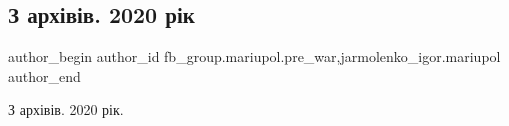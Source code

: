  
 
 
 
 

\subsection{З архівів. 2020 рік}
\label{sec:10_02_2023.fb.fb_group.mariupol.pre_war.1.z_arkh_v_v__2020_r_k}
 
\ifcmt
 author_begin
   author_id fb_group.mariupol.pre_war,jarmolenko_igor.mariupol
 author_end
\fi

З архівів. 2020 рік.


